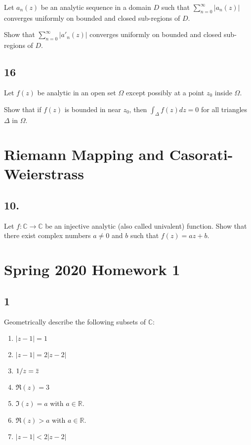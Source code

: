 Let \(a_n(z)\) be an analytic sequence in a domain \(D\) such that
\(\displaystyle \sum_{n=0}^\infty |a_n(z)|\) converges uniformly on
bounded and closed sub-regions of \(D\).

Show that \(\displaystyle \sum_{n=0}^\infty |a'_n(z)|\) converges
uniformly on bounded and closed sub-regions of \(D\).

\hypertarget{section-24}{%
\subsection{16}\label{section-24}}

Let \(f(z)\) be analytic in an open set \(\Omega\) except possibly at a
point \(z_0\) inside \(\Omega\).

Show that if \(f(z)\) is bounded in near \(z_0\), then
\(\displaystyle \int_\Delta f(z) dz = 0\) for all triangles \(\Delta\)
in \(\Omega\).

\hypertarget{riemann-mapping-and-casorati-weierstrass}{%
\section{Riemann Mapping and
Casorati-Weierstrass}\label{riemann-mapping-and-casorati-weierstrass}}

\hypertarget{section-25}{%
\subsection{10.}\label{section-25}}

Let \(f: {\mathbb C} \rightarrow {\mathbb C}\) be an injective analytic
(also called univalent) function. Show that there exist complex numbers
\(a \neq 0\) and \(b\) such that \(f(z) = az + b\).

\hypertarget{spring-2020-homework-1}{%
\section{Spring 2020 Homework 1}\label{spring-2020-homework-1}}

\hypertarget{section-26}{%
\subsection{1}\label{section-26}}

Geometrically describe the following subsets of \({\mathbb{C}}\):

\begin{enumerate}
\def\labelenumi{\alph{enumi}.}
\tightlist
\item
  \({\left\lvert {z-1} \right\rvert} = 1\)
\item
  \({\left\lvert {z-1} \right\rvert} = 2{\left\lvert {z-2} \right\rvert}\)
\item
  \(1/z = \mkern 1.5mu\overline{\mkern-1.5muz\mkern-1.5mu}\mkern 1.5mu\)
\item
  \(\Re(z) = 3\)
\item
  \(\Im(z) = a\) with \(a\in {\mathbb{R}}\).
\item
  \(\Re(z) > a\) with \(a\in {\mathbb{R}}\).
\item
  \({\left\lvert {z-1} \right\rvert} < 2{\left\lvert {z-2} \right\rvert}\)
\end{enumerate}

